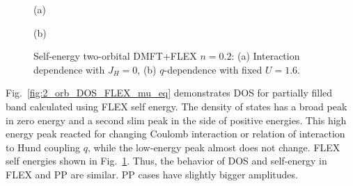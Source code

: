 \begin{figure}[h!]
\begin{minipage}[h]{0.5\linewidth}
 (a) \\
\end{minipage}
\hfill
\begin{minipage}[h]{0.5\linewidth}
 (b) \\
\end{minipage}
\caption{Self-energy two-orbital DMFT+FLEX $n=0.2$: (a) Interaction dependence with $J_{H}=0$, (b) $q$-dependence with fixed $U=1.6$.}
\label{fig:2_orb_Sigma_FLEX_mu_eq}
\end{figure}

Fig.~\ref{fig:2_orb_DOS_FLEX_mu_eq} demonstrates DOS for partially filled band calculated using FLEX self energy. The density of states has a broad peak in zero energy and a second slim peak in the side of positive energies. This high energy peak reacted for changing Coulomb interaction or relation of interaction to Hund coupling $q$, while the low-energy peak almost does not change. FLEX self energies shown in Fig.~\ref{fig:2_orb_Sigma_FLEX_mu_eq}. Thus, the behavior of DOS and self-energy in FLEX and PP are similar. PP cases have slightly bigger amplitudes.

